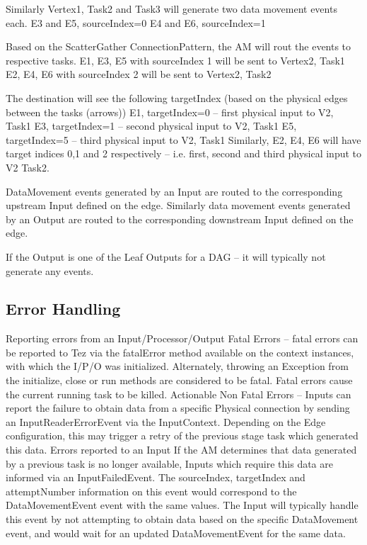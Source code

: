 \documentclass[twocolumn]{article}
\begin{document}
Similarly Vertex1, Task2 and Task3 will generate two data movement
events each. E3 and E5, sourceIndex=0 E4 and E6, sourceIndex=1

Based on the ScatterGather ConnectionPattern, the AM will rout the
events to respective tasks. E1, E3, E5 with sourceIndex 1 will be sent
to Vertex2, Task1 E2, E4, E6 with sourceIndex 2 will be sent to Vertex2,
Task2

The destination will see the following targetIndex (based on the
physical edges between the tasks (arrows)) E1, targetIndex=0 -- first
physical input to V2, Task1 E3, targetIndex=1 -- second physical input
to V2, Task1 E5, targetIndex=5 -- third physical input to V2, Task1
Similarly, E2, E4, E6 will have target indices 0,1 and 2 respectively --
i.e. first, second and third physical input to V2 Task2.

DataMovement events generated by an Input are routed to the
corresponding upstream Input defined on the edge. Similarly data
movement events generated by an Output are routed to the corresponding
downstream Input defined on the edge.

If the Output is one of the Leaf Outputs for a DAG -- it will typically
not generate any events.

\subsection{Error Handling}

Reporting errors from an Input/Processor/Output Fatal Errors -- fatal
errors can be reported to Tez via the fatalError method available on the
context instances, with which the I/P/O was initialized. Alternately,
throwing an Exception from the initialize, close or run methods are
considered to be fatal. Fatal errors cause the current running task to
be killed. Actionable Non Fatal Errors -- Inputs can report the failure
to obtain data from a specific Physical connection by sending an
InputReaderErrorEvent via the InputContext. Depending on the Edge
configuration, this may trigger a retry of the previous stage task which
generated this data. Errors reported to an Input If the AM determines
that data generated by a previous task is no longer available, Inputs
which require this data are informed via an InputFailedEvent. The
sourceIndex, targetIndex and attemptNumber information on this event
would correspond to the DataMovementEvent event with the same values.
The Input will typically handle this event by not attempting to obtain
data based on the specific DataMovement event, and would wait for an
updated DataMovementEvent for the same data.
\end{document}
